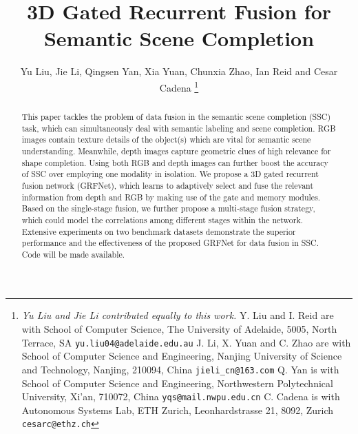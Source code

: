 \documentclass[10pt,twocolumn,letterpaper]{article}
\begin{document}
\title{3D Gated Recurrent Fusion for Semantic Scene Completion}





\author{Yu Liu, Jie Li, Qingsen Yan,
Xia Yuan, Chunxia Zhao, Ian Reid and Cesar Cadena
\thanks{
\noindent
\textit{Yu Liu and Jie Li contributed equally to this work.}
\newline
Y. Liu and I. Reid 
are with School of Computer Science, The University of Adelaide,
5005, North Terrace, SA 
{\tt\small yu.liu04@adelaide.edu.au}
\newline
J. Li, X. Yuan and C. Zhao 
are with School of Computer Science and Engineering, Nanjing University of Science and Technology, Nanjing, 210094, China {\tt\small jieli\_cn@163.com}
\newline
 Q. Yan is with School of Computer Science and Engineering, Northwestern Polytechnical University, Xi'an, 710072, China {\tt\small yqs@mail.nwpu.edu.cn}
\newline
C. Cadena 
is with Autonomous Systems Lab, ETH Zurich, 
Leonhardstrasse 21, 8092, Zurich 
{\tt\small cesarc@ethz.ch}
}
}


\maketitle




\begin{abstract}
This paper tackles the problem of data fusion in the semantic scene completion (SSC) task, which can simultaneously deal with semantic labeling and scene completion. RGB images contain texture details of the object(s) which are vital for semantic scene understanding. Meanwhile, depth images capture geometric clues of high relevance for shape completion. Using both RGB and depth images can further boost the accuracy of SSC over employing one modality in isolation. We propose a 3D gated recurrent fusion network (GRFNet), which learns to adaptively select and fuse the relevant information from depth and RGB by making use of the gate and memory modules.
Based on the single-stage fusion, we further propose a multi-stage fusion strategy, which could model the correlations among different stages within the network. Extensive experiments on two benchmark datasets demonstrate the superior performance and the effectiveness of the proposed GRFNet for data fusion in SSC. Code will be made available.

\end{abstract}
\end{document}
